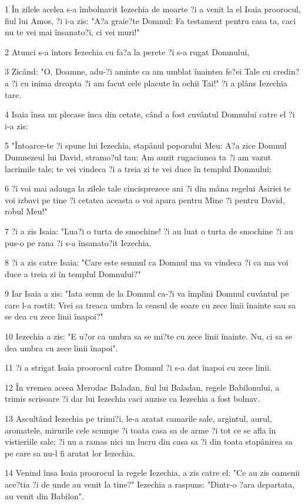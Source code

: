 \par 1 În zilele acelea s-a îmbolnavit Iezechia de moarte ?i a venit la el Isaia proorocul, fiul lui Amos, ?i i-a zis: "A?a graie?te Domnul: Fa testament pentru casa ta, caci nu te vei mai însanato?i, ci vei muri!"
\par 2 Atunci s-a întors Iezechia cu fa?a la perete ?i s-a rugat Domnului,
\par 3 Zicând: "O, Doamne, adu-?i aminte ca am umblat înaintea fe?ei Tale cu credin?a ?i cu inima dreapta ?i am facut cele placute în ochii Tai!" ?i a plâns Iezechia tare.
\par 4 Isaia însa nu plecase înca din cetate, când a fost cuvântul Domnului catre el ?i i-a zis:
\par 5 "Întoarce-te ?i spune lui Iezechia, stapânul poporului Meu: A?a zice Domnul Dumnezeul lui David, stramo?ul tau: Am auzit rugaciunea ta ?i am vazut lacrimile tale; te vei vindeca ?i a treia zi te vei duce în templul Domnului;
\par 6 ?i voi mai adauga la zilele tale cincisprezece ani ?i din mâna regelui Asiriei te voi izbavi pe tine ?i cetatea aceasta o voi apara pentru Mine ?i pentru David, robul Meu!"
\par 7 ?i a zis Isaia: "Lua?i o turta de smochine! ?i au luat o turta de smochine ?i au pus-o pe rana ?i s-a însanato?it Iezechia.
\par 8 ?i a zis catre Isaia: "Care este semnul ca Domnul ma va vindeca ?i ca ma voi duce a treia zi în templul Domnului?"
\par 9 Iar Isaia a zis: "Iata semn de la Domnul ca-?i va împlini Domnul cuvântul pe care l-a rostit: Vrei sa treaca umbra la ceasul de soare cu zece linii înainte sau sa se dea cu zece linii înapoi?"
\par 10 Iezechia a zis: "E u?or ca umbra sa se mi?te cu zece linii înainte. Nu, ci sa se dea umbra cu zece linii înapoi".
\par 11 ?i a strigat Isaia proorocul catre Domnul ?i s-a dat înapoi cu zece linii.
\par 12 În vremea aceea Merodac Baladan, fiul lui Baladan, regele Babilonului, a trimis scrisoare ?i dar lui Iezechia caci auzise ca Iezechia a fost bolnav.
\par 13 Ascultând Iezechia pe trimi?i, le-a aratat camarile sale, argintul, aurul, aromatele, mirurile cele scumpe ?i toata casa sa de arme ?i tot ce se afla în vistieriile sale; ?i nu a ramas nici un lucru din casa sa ?i din toata stapânirea sa pe care sa nu-l fi aratat lor Iezechia.
\par 14 Venind însa Isaia proorocul la regele Iezechia, a zis catre el: "Ce au zis oamenii ace?tia ?i de unde au venit la tine?" Iezechia a raspuns: "Dintr-o ?ara departata, au venit din Babilon".
